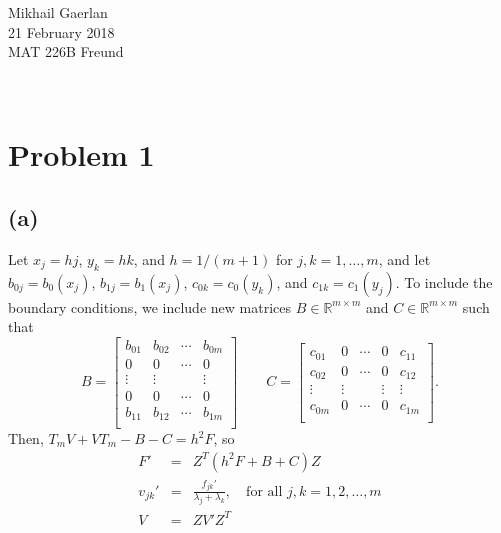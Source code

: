 \documentclass[11pt]{article}
\newcommand{\R}{\ensuremath{\mathbb{R}}}
\theoremstyle{definition}
\theoremstyle{remark}
\newcommand{\newquestion}{\hrulefill\vspace{-0.8\baselineskip}\\\null\hrulefill\vspace{-1.0\baselineskip}}
\newcommand{\newpart}{\vspace{-0.5\baselineskip}\hrulefill\vspace{-1.3\baselineskip}}
\theoremstyle{plain}
\begin{document}
  \begin{flushright}
    Mikhail Gaerlan\\
    21 February 2018\\
    MAT 226B Freund
  \end{flushright}
\vspace{-1.3\baselineskip}


\newquestion
%
%
\section*{Problem 1}

\newpart
\subsection*{(a)}
Let $x_j=hj$, $y_k=hk$, and $h=1/\left(m+1\right)$ for $j,k=1,\dots,m$, and let $b_{0j}=b_0\left(x_j\right)$, $b_{1j}=b_1\left(x_j\right)$, $c_{0k}=c_0\left(y_k\right)$, and $c_{1k}=c_1\left(y_j\right)$. To include the boundary conditions, we include new matrices $B\in\R^{m\times m}$ and $C\in\R^{m\times m}$ such that
\begin{equation*}
  B=\left[
    \begin{array}{cccc}
      b_{01}&b_{02}&\cdots&b_{0m}\\
      0&0&\cdots&0\\
      \vdots&\vdots&&\vdots\\
      0&0&\cdots&0\\
      b_{11}&b_{12}&\cdots&b_{1m}\\
    \end{array}
  \right]\qquad C=\left[
  \begin{array}{ccccc}
    c_{01}&0&\cdots&0&c_{11}\\
    c_{02}&0&\cdots&0&c_{12}\\
    \vdots&\vdots&&\vdots&\vdots\\
    c_{0m}&0&\cdots&0&c_{1m}\\
  \end{array}
  \right].
\end{equation*}
Then, $T_mV+VT_m-B-C=h^2F$, so
\begin{eqnarray*}
  F'&=&Z^T\left(h^2F+B+C\right)Z\\
  v_{jk}'&=&\frac{f_{jk}'}{\lambda_j+\lambda_k},\quad\textrm{for all }j,k=1,2,\dots,m\\
  V&=&ZV'Z^T
\end{eqnarray*}
\end{document}
